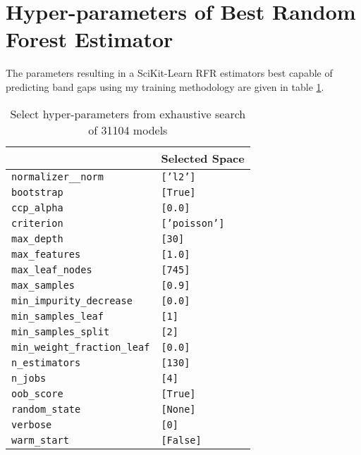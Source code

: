 \section*{Hyper-parameters of Best Random Forest Estimator}
\label{sec:org4ade3f5}
The parameters resulting in a SciKit-Learn RFR estimators best capable
of predicting band gaps using my training methodology are given in table \ref{tbl:rfrHPO}.

\begin{table}[htbp]
\caption{\label{tbl:rfrHPO} Select hyper-parameters from exhaustive search of 31104 models}
\centering
\begin{tabular}{ll}
 & Selected Space\\[0pt]
\hline
\texttt{normalizer\_\_norm} & \texttt{['l2']}\\[0pt]
\texttt{bootstrap} & \texttt{[True]}\\[0pt]
\texttt{ccp\_alpha} & \texttt{[0.0]}\\[0pt]
\texttt{criterion} & \texttt{['poisson']}\\[0pt]
\texttt{max\_depth} & \texttt{[30]}\\[0pt]
\texttt{max\_features} & \texttt{[1.0]}\\[0pt]
\texttt{max\_leaf\_nodes} & \texttt{[745]}\\[0pt]
\texttt{max\_samples} & \texttt{[0.9]}\\[0pt]
\texttt{min\_impurity\_decrease} & \texttt{[0.0]}\\[0pt]
\texttt{min\_samples\_leaf} & \texttt{[1]}\\[0pt]
\texttt{min\_samples\_split} & \texttt{[2]}\\[0pt]
\texttt{min\_weight\_fraction\_leaf} & \texttt{[0.0]}\\[0pt]
\texttt{n\_estimators} & \texttt{[130]}\\[0pt]
\texttt{n\_jobs} & \texttt{[4]}\\[0pt]
\texttt{oob\_score} & \texttt{[True]}\\[0pt]
\texttt{random\_state} & \texttt{[None]}\\[0pt]
\texttt{verbose} & \texttt{[0]}\\[0pt]
\texttt{warm\_start} & \texttt{[False]}\\[0pt]
\end{tabular}
\end{table}
